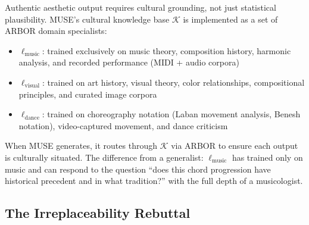 \documentclass[12pt]{article}
\begin{document}
Authentic aesthetic output requires cultural grounding, not just statistical plausibility. MUSE's cultural knowledge base $\mathcal{K}$ is implemented as a set of ARBOR domain specialists:
\begin{itemize}
    \item $\ell_{\text{music}}$: trained exclusively on music theory, composition history, harmonic analysis, and recorded performance (MIDI + audio corpora)
    \item $\ell_{\text{visual}}$: trained on art history, visual theory, color relationships, compositional principles, and curated image corpora
    \item $\ell_{\text{dance}}$: trained on choreography notation (Laban movement analysis, Benesh notation), video-captured movement, and dance criticism
\end{itemize}

When MUSE generates, it routes through $\mathcal{K}$ via ARBOR to ensure each output is culturally situated. The difference from a generalist: $\ell_{\text{music}}$ has trained only on music and can respond to the question ``does this chord progression have historical precedent and in what tradition?'' with the full depth of a musicologist.

\subsection{The Irreplaceability Rebuttal}
\end{document}
